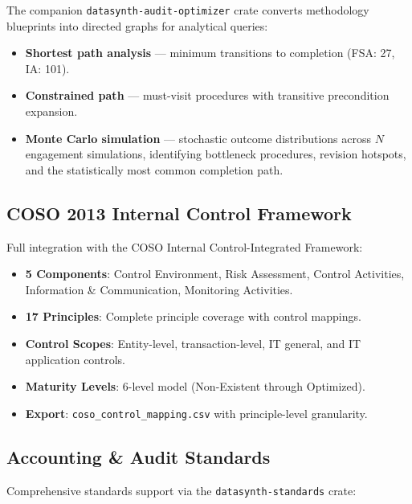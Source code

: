 \documentclass[11pt,a4paper]{article}
\begin{document}
The companion \texttt{datasynth-audit-optimizer} crate converts methodology
blueprints into directed graphs for analytical queries:

\begin{itemize}[leftmargin=1.2em, itemsep=3pt]
  \item \textbf{Shortest path analysis} --- minimum transitions to completion
        (FSA: 27, IA: 101).
  \item \textbf{Constrained path} --- must-visit procedures with transitive
        precondition expansion.
  \item \textbf{Monte Carlo simulation} --- stochastic outcome distributions
        across $N$ engagement simulations, identifying bottleneck procedures,
        revision hotspots, and the statistically most common completion path.
\end{itemize}

\subsection{COSO 2013 Internal Control Framework}

Full integration with the COSO Internal Control-Integrated Framework:

\begin{itemize}[leftmargin=1.4em, itemsep=2pt]
  \item \textbf{5 Components}: Control Environment, Risk Assessment,
        Control Activities, Information \& Communication, Monitoring Activities.
  \item \textbf{17 Principles}: Complete principle coverage with control mappings.
  \item \textbf{Control Scopes}: Entity-level, transaction-level, IT general,
        and IT application controls.
  \item \textbf{Maturity Levels}: 6-level model (Non-Existent through Optimized).
  \item \textbf{Export}: \texttt{coso\_control\_mapping.csv} with principle-level granularity.
\end{itemize}

\subsection{Accounting \& Audit Standards}

Comprehensive standards support via the \texttt{datasynth-standards} crate:
\end{document}
